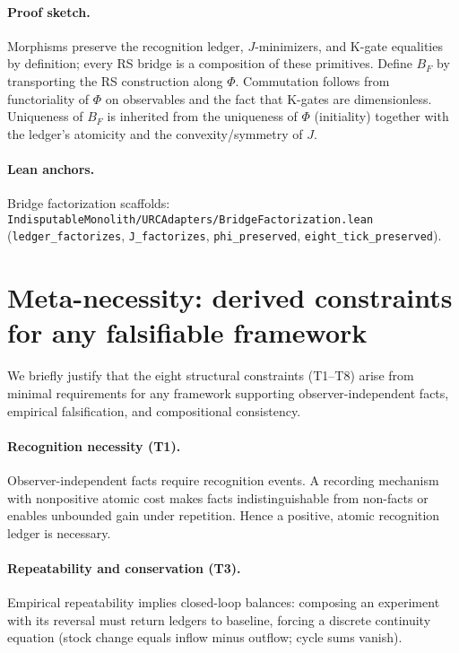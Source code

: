 \documentclass[11pt]{article}
\begin{document}
\paragraph{Proof sketch.} Morphisms preserve the recognition ledger, \(J\)\mbox{-}minimizers, and K\mbox{-}gate equalities by definition; every RS bridge is a composition of these primitives. Define \(B_F\) by transporting the RS construction along \(\Phi\). Commutation follows from functoriality of \(\Phi\) on observables and the fact that K\mbox{-}gates are dimensionless. Uniqueness of \(B_F\) is inherited from the uniqueness of \(\Phi\) (initiality) together with the ledger's atomicity and the convexity/symmetry of \(J\).

\paragraph{Lean anchors.} Bridge factorization scaffolds: \texttt{IndisputableMonolith/URCAdapters/BridgeFactorization.lean} (\texttt{ledger\_factorizes}, \texttt{J\_factorizes}, \texttt{phi\_preserved}, \texttt{eight\_tick\_preserved}).

\section{Meta-necessity: derived constraints for any falsifiable framework}\label{sec:meta-necessity}
We briefly justify that the eight structural constraints (T1--T8) arise from minimal requirements for any framework supporting observer-independent facts, empirical falsification, and compositional consistency.

\paragraph{Recognition necessity (T1).} Observer-independent facts require recognition events. A recording mechanism with nonpositive atomic cost makes facts indistinguishable from non-facts or enables unbounded gain under repetition. Hence a positive, atomic recognition ledger is necessary.

\paragraph{Repeatability and conservation (T3).} Empirical repeatability implies closed-loop balances: composing an experiment with its reversal must return ledgers to baseline, forcing a discrete continuity equation (stock change equals inflow minus outflow; cycle sums vanish).
\end{document}
